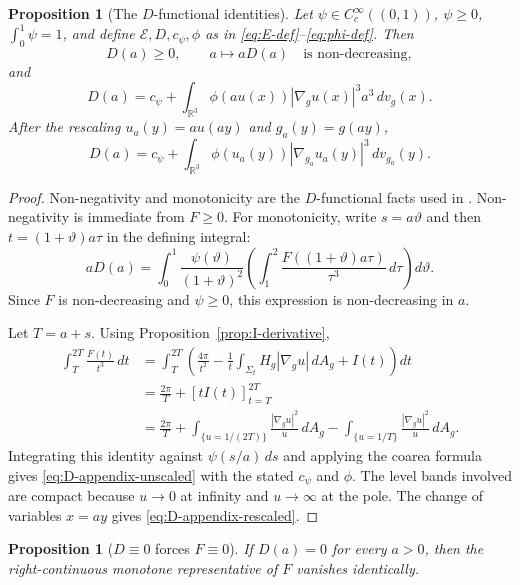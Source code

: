 \documentclass[11pt]{amsart}
\numberwithin{equation}{section}
\newtheorem{proposition}[theorem]{Proposition}
\theoremstyle{definition}
\newcommand{\R}{\mathbb R}
\newcommand{\Efun}{\mathcal E}
\begin{document}
\begin{proposition}[The $D$-functional identities]\label{prop:D-functional-facts}
Let $\psi\in C_c^\infty((0,1))$, $\psi\ge0$, $\int_0^1\psi=1$, and define $\Efun,D,c_\psi,\phi$ as in \eqref{eq:E-def}--\eqref{eq:phi-def}.  Then
$$
        D(a)\ge0,
        \qquad
        a\mapsto aD(a)\quad\text{is non-decreasing},
$$
and
\begin{equation}\label{eq:D-appendix-unscaled}
        D(a)=c_\psi+
        \int_{\R^3}\phi(au(x))|\nabla_g u(x)|^3a^3\,dv_g(x).
\end{equation}
After the rescaling $u_a(y)=au(ay)$ and $g_a(y)=g(ay)$,
\begin{equation}\label{eq:D-appendix-rescaled}
        D(a)=c_\psi+
        \int_{\R^3}\phi(u_a(y))|\nabla_{g_a}u_a(y)|^3\,dv_{g_a}(y).
\end{equation}
\end{proposition}

\begin{proof}
Non-negativity and monotonicity are the $D$-functional facts used in \cite[Propositions~14 and~15]{MYrigidity}.  Non-negativity is immediate from $F\ge0$.  For monotonicity, write $s=a\vartheta$ and then $t=(1+\vartheta)a\tau$ in the defining integral:
$$
        aD(a)=\int_0^1\frac{\psi(\vartheta)}{(1+\vartheta)^2}
        \left(\int_1^2\frac{F((1+\vartheta)a\tau)}{\tau^3}\,d\tau\right)d\vartheta.
$$
Since $F$ is non-decreasing and $\psi\ge0$, this expression is non-decreasing in $a$.

Let $T=a+s$.  Using Proposition~\ref{prop:I-derivative},
$$
\begin{aligned}
        \int_T^{2T}\frac{F(t)}{t^3}\,dt
        &=\int_T^{2T}\left(\frac{4\pi}{t^2}
        -\frac1t\int_{\Sigma_t}H_g|\nabla_g u|\,dA_g
        +I(t)\right)dt \\
        &=\frac{2\pi}{T}+[tI(t)]_{t=T}^{2T} \\
        &=\frac{2\pi}{T}
        +\int_{\{u=1/(2T)\}}\frac{|\nabla_g u|^2}{u}\,dA_g
        -\int_{\{u=1/T\}}\frac{|\nabla_g u|^2}{u}\,dA_g.
\end{aligned}
$$
Integrating this identity against $\psi(s/a)\,ds$ and applying the coarea formula gives \eqref{eq:D-appendix-unscaled} with the stated $c_\psi$ and $\phi$.  The level bands involved are compact because $u\to0$ at infinity and $u\to\infty$ at the pole.  The change of variables $x=ay$ gives \eqref{eq:D-appendix-rescaled}.
\end{proof}

\begin{proposition}[$D\equiv0$ forces $F\equiv0$]\label{prop:D-zero-F-zero}
If $D(a)=0$ for every $a>0$, then the right-continuous monotone representative of $F$ vanishes identically.
\end{proposition}
\end{document}
